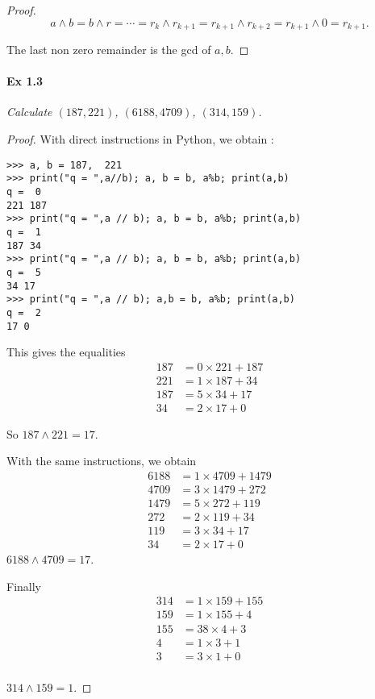\documentclass[11pt,a4paper]{article}
\begin{document}
{\begin{proof}
$$a \wedge b = b \wedge r = \cdots = r_k \wedge r_{k+1} = r_{k+1} \wedge r_{k+2} =  r_{k+1} \wedge 0 = r_{k+1}.$$

The last non zero remainder is the gcd of $a,b$. 
\end{proof}

\paragraph { Ex 1.3}
{\it Calculate $(187, 221)$, $(6188, 4709)$, $(314, 159)$.}
\begin{proof}
With direct instructions in Python, we obtain :

\begin{verbatim}
>>> a, b = 187,  221
>>> print("q = ",a//b); a, b = b, a%b; print(a,b)
q =  0
221 187
>>> print("q = ",a // b); a, b = b, a%b; print(a,b)
q =  1
187 34
>>> print("q = ",a // b); a, b = b, a%b; print(a,b)
q =  5
34 17
>>> print("q = ",a // b); a,b = b, a%b; print(a,b)
q =  2 
17 0
\end{verbatim}
This gives the equalities
\begin{align*}
187 &= 0 \times 221 + 187\\
221 &= 1\times187 + 34\\
187 &= 5 \times 34 + 17\\
34 &= 2 \times 17 + 0
\end{align*}

So $187 \wedge  221  = 17$.

With the same instructions, we obtain 
\begin{align*}
 6188 &= 1 \times 4709 + 1479\\
4709 &= 3 \times 1479 + 272\\
1479 &= 5 \times 272 + 119\\
272&=2\times119 + 34\\
119 &= 3 \times 34+ 17\\
34 &= 2 \times 17 + 0\
\end{align*}
$6188 \wedge 4709 = 17$.

Finally
\begin{align*}
 314 &=1 \times159+155\\
159 &= 1 \times 155 + 4\\
155 &=38\times 4 + 3\\
4&= 1\times 3 + 1\\
3 &=3 \times 1+0\\
\end{align*}

$314 \wedge 159 = 1$.


\end{proof}}
\end{document}
